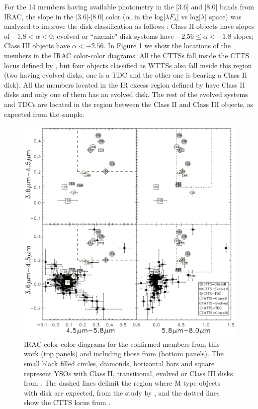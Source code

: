 \documentclass[12pt]{article}
\begin{document}
For the 14 members having available photometry in the [3.6] and [8.0] bands from IRAC, the slope in the [3.6]-[8.0] color ($\alpha$, in the log[$\lambda F_\lambda$] vs log[$\lambda$] space) was analyzed to improve the disk classification as follows \citep{Lada2006}: Class II objects have slopes of $-1.8<\alpha<0$; evolved or ``anemic" disk systems \citep{Hernandez2007a} have $-2.56\le\alpha<-1.8$ slopes; Class III objects have $\alpha<-2.56$. In Figure \ref{fig_BOSS:irac} we show the locations of the members in the IRAC color-color diagrams. All the CTTSs fall inside the CTTS locus defined by \citet{Hartmann2005}, but four objects classified as WTTSs also fall inside this region (two having evolved disks, one is a TDC and the other one is bearing a Class II disk). All the members located in the IR excess region defined by \citet{Luhman2005} have Class II disks and only one of them has an evolved disk. The rest of the evolved systems and TDCs are located in the region between the Class II and Class III objects, as expected from the \citet{Hernandez2007b} sample. 

\begin{figure}[ht!]
	\centering
	\includegraphics[width=1.0\textwidth]{f9.pdf}
	\caption[IRAC color-color diagrams of the confirmed members from the BOSS spectra]{IRAC color-color diagrams for the confirmed members from this work (top panels) and including those from \citet{Hernandez2007b} (bottom panels). The small black filled circles, diamonds, horizontal bars and square represent YSOs with Class II, transitional, evolved or Class III disks from \citet{Hernandez2007b}. The dashed lines delimit the region where M type objects with disk are expected, from the study by \citet{Luhman2005}, and the dotted lines show the CTTS locus from \citet{Hartmann2005}.}
	\label{fig_BOSS:irac}
\end{figure}
\end{document}
